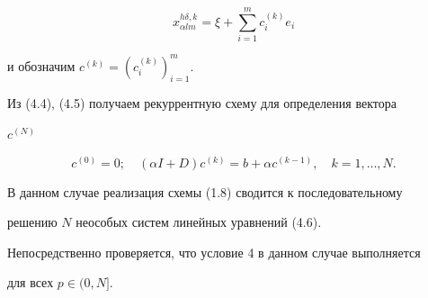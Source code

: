 \begin{exam}
\begin{equation}


x_{\alpha l m}^{h \delta, k}= \xi+ \sum_{i=1}^m c_i^{(k)} e_i\tag{4.5}


\end{equation}


и обозначим $c^{(k)}=(c_i^{(k)})_{i=1}^m$.


Из (4.4), (4.5) получаем рекуррентную схему для определения вектора


$c^{(N)}$


\begin{equation}


c^{(0)}=0; \quad


(\alpha I +D)c^{(k)}=b+ \alpha c^{(k-1)},\quad k=1, \dotsc , N.


\tag{4.6}


\end{equation}


В данном случае реализация схемы (1.8) сводится к последовательному


решению $N$ неособых систем линейных уравнений (4.6).


Непосредственно проверяется, что условие 4 в данном случае выполняется


для всех $p \in (0,N]$.


\end{exam}





